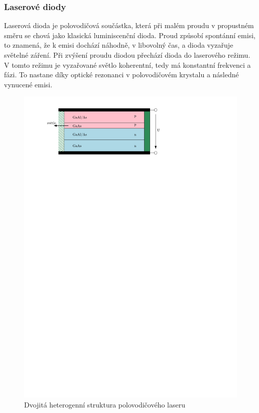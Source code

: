 \subsubsection{Laserové diody}
Laserová dioda je polovodičová součástka, která při malém proudu v propustném směru se chová jako klasická luminiscenční dioda. Proud způsobí spontánní emisi, to znamená, že k emisi dochází náhodně, v libovolný čas, a dioda vyzařuje světelné záření. Při zvýšení proudu diodou přechází dioda do laserového režimu. V tomto režimu je vyzařované světlo koherentní, tedy má konstantní frekvenci a fázi. To nastane díky optické rezonanci v polovodičovém krystalu a následné vynucené emisi.

\begin{figure}[H]
    \begin{center}
        \includegraphics[scale=1]{img/laser}
    \end{center}
    \caption{Dvojitá heterogenní struktura polovodičového laseru}
\end{figure}

